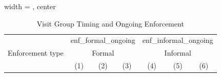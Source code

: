 
\begin{table}[htbp]
   
   \caption{\label{tab:sanitary_visit_enforcement_iterative} Visit Group Timing and Ongoing Enforcement}
   \bigskip
   
   \centering
   
   \begin{adjustbox}{width = \textwidth, center}
      
      
      \begin{tabular}{lcccccc}
         \toprule
         
          & \multicolumn{3}{c}{enf\_formal\_ongoing} & \multicolumn{3}{c}{enf\_informal\_ongoing}\\
         
         Enforcement type & \multicolumn{3}{c}{Formal} & \multicolumn{3}{c}{Informal} \\ 
         
                                                     & (1)             & (2)                    & (3)           & (4)            & (5)            & (6)\\  
         

\end{tabular}
\end{adjustbox}
\end{table}
